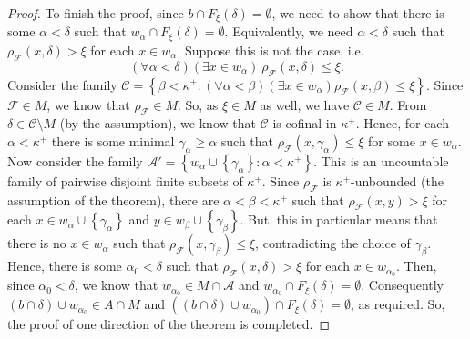 \documentclass[10pt,a4paper]{amsart}
\newcommand{\g}{\gamma}
\newcommand{\ps}{\emptyset}
\newcommand{\set}[1]{\left\{#1\right\}}
\renewcommand{\a}{\alpha}
\renewcommand{\b}{\beta}
\renewcommand{\d}{\delta}
\renewcommand{\k}{\kappa}
\begin{document}
\begin{proof}
	To finish the proof, since $b\cap F_{\xi}(\d)=\ps$, we need to show that there is some $\a<\d$ such that $w_{\a}\cap F_{\xi}(\d)=\ps$.
	Equivalently, we need $\a<\d$ such that $\rho_{\mathcal F}(x,\d)>\xi$ for each $x\in w_{\a}$.
	Suppose this is not the case, i.e. $$(\forall \a<\d)(\exists x\in w_{\a})\ \rho_{\mathcal F}(x,\d)\le\xi.$$
	Consider the family $\mathcal C=\set{\b<\k^+:(\forall \a<\b)(\exists x\in w_{\a})\rho_{\mathcal F}(x,\b)\le\xi}$.
	Since $\mathcal F\in M$, we know that $\rho_{\mathcal F}\in M$.
	So, as $\xi\in M$ as well, we have $\mathcal C\in M$.
	From $\d\in \mathcal C\setminus M$ (by the assumption), we know that $\mathcal C$ is cofinal in $\k^+$. %
	Hence, for each $\a<\k^+$ there is some minimal $\g_{\a}\ge\a$ such that $\rho_{\mathcal F}(x,\g_{\a})\le \xi$ for some $x\in w_{\a}$.
	Now consider the family $\mathcal A'=\set{w_{\a}\cup\set{\g_{\a}}:\a<\k^+}$.
	This is an uncountable family of pairwise disjoint finite subsets of $\k^+$.
	Since $\rho_{\mathcal F}$ is $\k^+$-unbounded (the assumption of the theorem), there are $\a<\b<\k^+$ such that $\rho_{\mathcal F}(x,y)>\xi$ for each $x\in w_{\a}\cup\set{\g_{\a}}$ and $y\in w_{\b}\cup\set{\g_{\b}}$.
	But, this in particular means that there is no $x\in w_{\a}$ such that $\rho_{\mathcal F}(x,\g_{\b})\le \xi$, contradicting the choice of $\g_{\b}$.
	Hence, there is some $\a_0<\d$ such that $\rho_{\mathcal F}(x,\d)>\xi$ for each $x\in w_{\a_0}$.
	Then, since $\a_0<\d$, we know that $w_{\a_0}\in M\cap \mathcal A$ and $w_{\a_0}\cap F_{\xi}(\d)=\ps$.
	Consequently $(b\cap\d)\cup w_{\a_0}\in A\cap M$ and $\left((b\cap\d)\cup w_{\a_0}\right)\cap F_{\xi}(\d)=\ps$, as required.
	So, the proof of one direction of the theorem is completed.


\end{proof}
\end{document}
